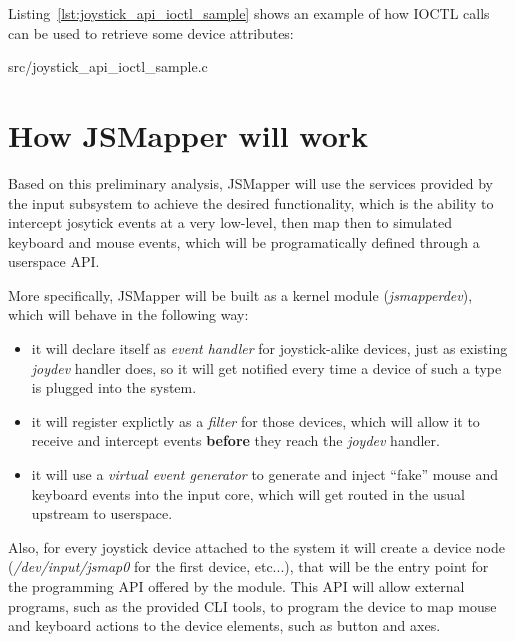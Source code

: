 Listing~\ref{lst:joystick_api_ioctl_sample} shows an example of how IOCTL calls can be used to retrieve some device attributes:

{src/joystick_api_ioctl_sample.c}


\section{How JSMapper will work}
Based on this preliminary analysis, JSMapper will use the services provided by the input subsystem to achieve the desired functionality, which is the ability to intercept josytick events at a very low-level, then map then to simulated keyboard and mouse events, which will be programatically defined through a userspace API.

More specifically, JSMapper will be built as a kernel module (\emph{jsmapperdev}), which will behave in the following way:
\begin{itemize}
	\item it will declare itself as \emph{event handler} for joystick-alike devices, just as existing \emph{joydev} handler does, so it will get notified every time a device of such a type is plugged into the system.
	\item it will register explictly as a \emph{filter} for those devices, which will allow it to receive and intercept events \textbf{before} they reach the \emph{joydev} handler.
	\item it will use a \emph{virtual event generator} to generate and inject ``fake'' mouse and keyboard events into the input core, which will get routed in the usual upstream to userspace.
\end{itemize}

Also, for every joystick device attached to the system it will create a device node (\emph{/dev/input/jsmap0} for the first device, etc...), that will be the entry point for the programming API offered by the module. This API will allow external programs, such as the provided CLI tools, to program the device to map mouse and keyboard actions to the device elements, such as button and axes.


